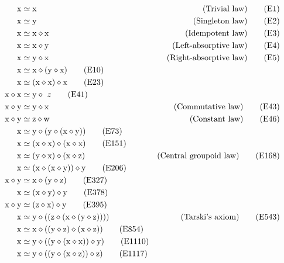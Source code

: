 \begin{align}
        \x &\formaleq \x & \hbox{(Trivial law)} \label{eq1}\tag{E1} \\
        \x &\formaleq \y & \hbox{(Singleton law)} \label{eq2}\tag{E2} \\
        \x &\formaleq \x \op \x & \hbox{(Idempotent law)} \label{eq3}\tag{E3} \\
        \x &\formaleq \x \op \y & \hbox{(Left-absorptive law)} \label{eq4}\tag{E4} \\
        \x &\formaleq \y \op \x & \hbox{(Right-absorptive law)} \label{eq5}\tag{E5} \\
        \x &\formaleq \x \op (\y \op \x) \label{eq10}\tag{E10} \\
        \x &\formaleq (\x \op \x) \op \x \label{eq23}\tag{E23} \\
        \x \op \x &\formaleq \y \op\ z \label{eq41}\tag{E41} \\
        \x \op \y &\formaleq \y \op \x & \hbox{(Commutative law)} \label{eq43}\tag{E43} \\
        \x \op \y &\formaleq \z \op \w & \hbox{(Constant law)} \label{eq46}\tag{E46} \\
        \x &\formaleq \y \op (\y \op (\x \op \y))  \label{eq73}\tag{E73} \\
        \x &\formaleq (\x \op \x) \op (\x \op \x) \label{eq151}\tag{E151} \\
        \x &\formaleq (\y \op \x) \op (\x \op \z) & \hbox{(Central groupoid law)} \label{eq168}\tag{E168} \\
        \x &\formaleq (\x \op (\x \op \y)) \op \y \label{eq206}\tag{E206} \\
        \x \op \y &\formaleq \x \op (\y \op \z) \label{eq327}\tag{E327} \\
        \x &\formaleq (\x \op \y) \op \y \label{eq378}\tag{E378} \\
        \x \op \y &\formaleq (\z \op \x) \op \y \label{eq395}\tag{E395} \\
        \x &\formaleq \y \op ( (\z \op (\x \op (\y \op \z)))) & \hbox{(Tarski's axiom)} \label{eq543}\tag{E543} \\
        \x &\formaleq \x \op ((\y \op \z) \op (\x \op \z)) \label{eq854}\tag{E854}\\
        \x &\formaleq \y \op ((\y \op (\x \op \x)) \op \y) \label{eq1110}\tag{E1110} \\
        \x &\formaleq \y \op ((\y \op (\x \op \z)) \op \z) \label{eq1117}\tag{E1117} \\

\end{align}
